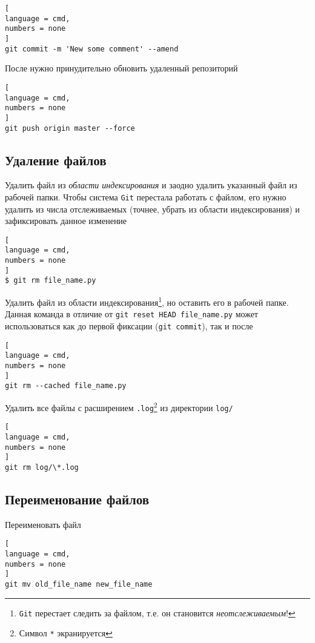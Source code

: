 \documentclass[%
	11pt,
	a4paper,
	utf8,
		]{article}
\begin{document}
\begin{lstlisting}[
language = cmd,
numbers = none
]
git commit -m 'New some comment' --amend
\end{lstlisting}

После нужно принудительно обновить удаленный репозиторий

\begin{lstlisting}[
language = cmd,
numbers = none
]
git push origin master --force
\end{lstlisting}


\subsection{Удаление файлов}

Удалить файл из \emph{области индексирования} и заодно удалить указанный файл из рабочей папки. Чтобы система \texttt{Git} перестала работать с файлом, его нужно удалить из числа отслеживаемых (точнее, убрать из области индексирования) и зафиксировать данное изменение 

\begin{lstlisting}[
language = cmd,
numbers = none
]
$ git rm file_name.py
\end{lstlisting}


Удалить файл из области индексирования\footnote{\texttt{Git} перестает следить за файлом, т.е. он становится \emph{неотслеживаемым}!}, но оставить его в рабочей папке. Данная команда в отличие от \texttt{git reset HEAD file\_name.py} может использоваться как до первой фиксации (\texttt{git commit}), так и после

\begin{lstlisting}[
language = cmd,
numbers = none
]
git rm --cached file_name.py
\end{lstlisting}


Удалить все файлы с расширением \texttt{.log}\footnote{Символ \texttt{*} экранируется} из директории \texttt{log/}

\begin{lstlisting}[
language = cmd,
numbers = none
]
git rm log/\*.log
\end{lstlisting}


\subsection{Переименование файлов}

Переименовать файл

\begin{lstlisting}[
language = cmd,
numbers = none
]
git mv old_file_name new_file_name
\end{lstlisting}
\end{document}
